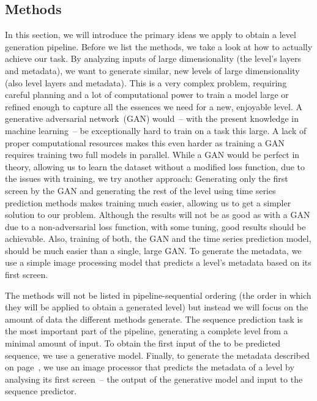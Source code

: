 \subsection{Methods}

In this section, we will introduce the primary ideas we apply to
obtain a level generation pipeline. Before we list the methods, we
take a look at how to actually achieve our task. By analyzing inputs
of large dimensionality (the level's layers and metadata), we want to
generate similar, new levels of large dimensionality (also level
layers and metadata). This is a very complex problem, requiring
careful planning and a lot of computational power to train a model
large or refined enough to capture all the essences we need for a new,
enjoyable level. A generative adversarial network~(GAN) would~-- with
the present knowledge in machine learning~-- be exceptionally hard to
train on a task this large. A lack of proper computational resources
makes this even harder as training a GAN requires training two full
models in parallel. While a GAN would be perfect in theory, allowing
us to learn the dataset without a modified loss function, due to the
issues with training, we try another approach: Generating only the
first screen by the GAN and generating the rest of the level using
time series prediction methods makes training much easier, allowing us
to get a simpler solution to our problem. Although the results will
not be as good as with a GAN due to a non-adversarial loss function,
with some tuning, good results should be achievable. Also, training of
both, the GAN and the time series prediction model, should be much
easier than a single, large GAN. To generate the metadata, we use a
simple image processing model that predicts a level's metadata based
on its first screen.

The methods will not be listed in pipeline-sequential ordering (the
order in which they will be applied to obtain a generated level) but
instead we will focus on the amount of data the different methods
generate. The sequence prediction task is the most important part of
the pipeline, generating a complete level from a minimal amount of
input. To obtain the first input of the to be predicted sequence, we
use a generative model. Finally, to generate the metadata described on
page~\pageref{par:metadata}, we use an image processor that predicts
the metadata of a level by analysing its first screen~-- the output of
the generative model and input to the sequence predictor.

